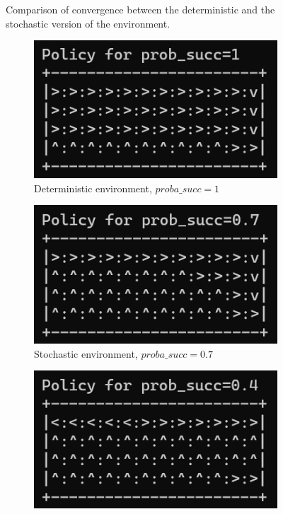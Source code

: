 \documentclass[a4paper]{article}
\begin{document}
\begin{figure}[h!]
	\centering
	
	\caption{Comparison of convergence between the deterministic and the stochastic version of the environment.}
	\label{fig:multi_plots}
\end{figure}
\begin{figure}[h!]
	\centering
	\begin{subfigure}[b]{0.3\textwidth}
		\centering
		\includegraphics[width=\textwidth]{plots/proba10.png}
		\caption{Deterministic environment, $proba\_succ = 1$}
	\end{subfigure}
	\hfill
	\begin{subfigure}[b]{0.3\textwidth}
		\centering
		\includegraphics[width=\textwidth]{plots/proba07.png}
		\caption{Stochastic environment, $proba\_succ = 0.7$}
	\end{subfigure}
	\hfill
	\begin{subfigure}[b]{0.3\textwidth}
		\centering
		\includegraphics[width=\textwidth]{plots/proba04.png}

\end{subfigure}
\end{figure}
\end{document}
